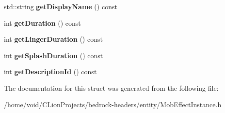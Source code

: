 \begin{DoxyCompactItemize}
std\+::string {\bfseries get\+Display\+Name} () const
\item 
\mbox{\label{struct_mob_effect_instance_ac5bb928d9793f95bfef2c79f09c07e7b}} 
int {\bfseries get\+Duration} () const
\item 
\mbox{\label{struct_mob_effect_instance_a68b453d11fde01d9916a9b32aea79506}} 
int {\bfseries get\+Linger\+Duration} () const
\item 
\mbox{\label{struct_mob_effect_instance_a8d2dfa4deeb1397476aad11a862c8d33}} 
int {\bfseries get\+Splash\+Duration} () const
\item 
\mbox{\label{struct_mob_effect_instance_a0ffb17234bd260c0159a7965635f6da6}} 
int {\bfseries get\+Description\+Id} () const
\end{DoxyCompactItemize}


The documentation for this struct was generated from the following file\+:\begin{DoxyCompactItemize}
\item 
/home/void/\+C\+Lion\+Projects/bedrock-\/headers/entity/Mob\+Effect\+Instance.\+h\end{DoxyCompactItemize}
